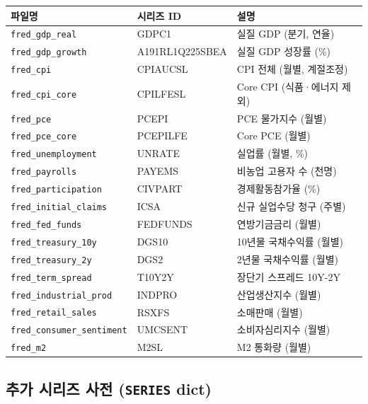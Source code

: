 \documentclass[11pt,a4paper]{article}
\newcommand{\code}[1]{\texttt{#1}}
\newcommand{\file}[1]{\texttt{\textcolor{string}{#1}}}
\begin{document}
\begin{longtable}{l l l}
\toprule
\textbf{파일명} & \textbf{시리즈 ID} & \textbf{설명} \\
\midrule
\endhead
\file{fred\_gdp\_real}         & GDPC1           & 실질 GDP (분기, 연율) \\
\file{fred\_gdp\_growth}       & A191RL1Q225SBEA & 실질 GDP 성장률 (\%) \\
\file{fred\_cpi}               & CPIAUCSL        & CPI 전체 (월별, 계절조정) \\
\file{fred\_cpi\_core}         & CPILFESL        & Core CPI (식품·에너지 제외) \\
\file{fred\_pce}               & PCEPI           & PCE 물가지수 (월별) \\
\file{fred\_pce\_core}         & PCEPILFE        & Core PCE (월별) \\
\file{fred\_unemployment}      & UNRATE          & 실업률 (월별, \%) \\
\file{fred\_payrolls}          & PAYEMS          & 비농업 고용자 수 (천명) \\
\file{fred\_participation}     & CIVPART         & 경제활동참가율 (\%) \\
\file{fred\_initial\_claims}   & ICSA            & 신규 실업수당 청구 (주별) \\
\file{fred\_fed\_funds}        & FEDFUNDS        & 연방기금금리 (월별) \\
\file{fred\_treasury\_10y}     & DGS10           & 10년물 국채수익률 (월별) \\
\file{fred\_treasury\_2y}      & DGS2            & 2년물 국채수익률 (월별) \\
\file{fred\_term\_spread}      & T10Y2Y          & 장단기 스프레드 10Y-2Y \\
\file{fred\_industrial\_prod}  & INDPRO          & 산업생산지수 (월별) \\
\file{fred\_retail\_sales}     & RSXFS           & 소매판매 (월별) \\
\file{fred\_consumer\_sentiment} & UMCSENT       & 소비자심리지수 (월별) \\
\file{fred\_m2}                & M2SL            & M2 통화량 (월별) \\
\bottomrule
\end{longtable}

\subsection{추가 시리즈 사전 (\code{SERIES} dict)}
\end{document}
